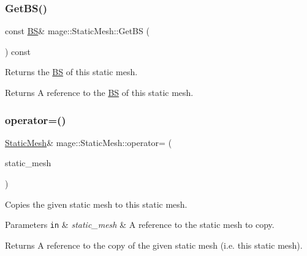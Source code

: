 \subsubsection{\texorpdfstring{Get\+B\+S()}{GetBS()}}
{\footnotesize\ttfamily const \hyperlink{structmage_1_1_b_s}{BS}\& mage\+::\+Static\+Mesh\+::\+Get\+BS (\begin{DoxyParamCaption}{ }\end{DoxyParamCaption}) const\hspace{0.3cm}{\ttfamily [noexcept]}}

Returns the \hyperlink{structmage_1_1_b_s}{BS} of this static mesh.

\begin{DoxyReturn}{Returns}
A reference to the \hyperlink{structmage_1_1_b_s}{BS} of this static mesh. 
\end{DoxyReturn}
\hypertarget{classmage_1_1_static_mesh_af73dd102f2de9cf7529e380895cfc8ff}{}\label{classmage_1_1_static_mesh_af73dd102f2de9cf7529e380895cfc8ff} 
\subsubsection{\texorpdfstring{operator=()}{operator=()}\hspace{0.1cm}{\footnotesize\ttfamily [1/2]}}
{\footnotesize\ttfamily \hyperlink{classmage_1_1_static_mesh}{Static\+Mesh}\& mage\+::\+Static\+Mesh\+::operator= (\begin{DoxyParamCaption}\item[{const \hyperlink{classmage_1_1_static_mesh}{Static\+Mesh} \&}]{static\+\_\+mesh }\end{DoxyParamCaption})\hspace{0.3cm}{\ttfamily [delete]}}

Copies the given static mesh to this static mesh.


\begin{DoxyParams}[1]{Parameters}
\mbox{\tt in}  & {\em static\+\_\+mesh} & A reference to the static mesh to copy. \\
\hline
\end{DoxyParams}
\begin{DoxyReturn}{Returns}
A reference to the copy of the given static mesh (i.\+e. this static mesh). 
\end{DoxyReturn}
\hypertarget{classmage_1_1_static_mesh_a38912f8555053abba649bea160d56e46}{}\label{classmage_1_1_static_mesh_a38912f8555053abba649bea160d56e46} 
